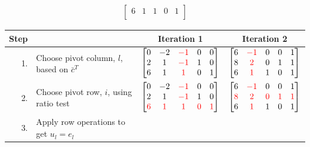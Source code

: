 \documentclass[12pt]{exam}
\begin{document}
\begin{questions}
\begin{parts}
\begin{align*}
\begin{bmatrix}
                6 & 1 & 1 & 0 & 1\\
            \end{bmatrix}
        \end{align*}
        \begin{table}[h!]
            \centering
            \begin{tabular}{rlcc}
            \hline
            \textbf{Step} && \textbf{Iteration 1} & \textbf{Iteration 2} \\
            \hline
            1.& Choose pivot column, $l$, based on $\bar c^T$ &
                $\begin{bmatrix}
                0 & -2 & \textcolor{red}{-1} & 0 & 0\\
                2 & 1 & \textcolor{red}{-1} & 1 & 0\\
                6 & 1 & \textcolor{red}{1} & 0 & 1\\
                \end{bmatrix}$ &
                $\begin{bmatrix}
                6 & \textcolor{red}{-1} & 0 & 0 & 1\\
                8 & \textcolor{red}{2} & 0 & 1 & 1\\
                6 & \textcolor{red}{1} & 1 & 0 & 1\\
                \end{bmatrix}$ \\
            2.& Choose pivot row, $i$, using ratio test & 
                $\begin{bmatrix}
                0 & -2 & \textcolor{red}{-1} & 0 & 0\\
                2 & 1 & \textcolor{red}{-1} & 1 & 0\\
                \textcolor{red}{6} & \textcolor{red}{1} & \textcolor{red}{1} & \textcolor{red}{0} & \textcolor{red}{1}\\
                \end{bmatrix}$ &
                $\begin{bmatrix}
                6 & \textcolor{red}{-1} & 0 & 0 & 1\\
                \textcolor{red}{8} & \textcolor{red}{2} & \textcolor{red}{0} & \textcolor{red}{1} & \textcolor{red}{1}\\
                6 & \textcolor{red}{1} & 1 & 0 & 1\\
                \end{bmatrix}$  \\
            3.& Apply row operations to get $u_l = e_l$ &

\end{tabular}
\end{table}
\end{parts}
\end{questions}
\end{document}
